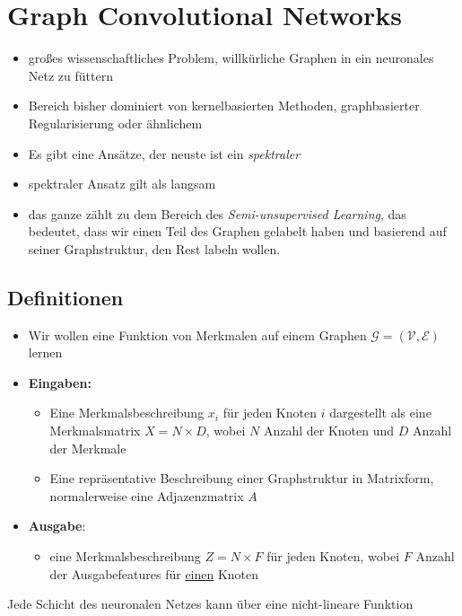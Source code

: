 \documentclass{scrartcl}
\begin{document}
\section{Graph Convolutional Networks}

\begin{itemize}
  \item großes wissenschaftliches Problem, willkürliche Graphen in ein neuronales Netz zu füttern
  \item Bereich bisher dominiert von kernelbasierten Methoden, graphbasierter Regularisierung oder ähnlichem
  \item Es gibt eine Ansätze, der neuste ist ein \emph{spektraler}
  \item spektraler Ansatz gilt als langsam
  \item das ganze zählt zu dem Bereich des \emph{Semi-unsupervised Learning}, das bedeutet, dass wir einen Teil des Graphen gelabelt haben und basierend auf seiner Graphstruktur, den Rest labeln wollen.
\end{itemize}

\subsection{Definitionen}

\begin{itemize}
  \item Wir wollen eine Funktion von Merkmalen auf einem Graphen $\mathcal{G} = (\mathcal{V}, \mathcal{E})$ lernen
  \item \textbf{Eingaben:}
  \begin{itemize}
    \item Eine Merkmalsbeschreibung $x_i$ für jeden Knoten $i$ dargestellt als eine Merkmalsmatrix $X = N \times D$, wobei $N$ Anzahl der Knoten und $D$ Anzahl der Merkmale
    \item Eine repräsentative Beschreibung einer Graphstruktur in Matrixform, normalerweise eine Adjazenzmatrix $A$
  \end{itemize}
  \item \textbf{Ausgabe}:
  \begin{itemize}
    \item eine Merkmalsbeschreibung $Z = N \times F$ für jeden Knoten, wobei $F$ Anzahl der Ausgabefeatures für \underline{einen} Knoten
  \end{itemize}
\end{itemize}

Jede Schicht des neuronalen Netzes kann über eine nicht-lineare Funktion
\end{document}

